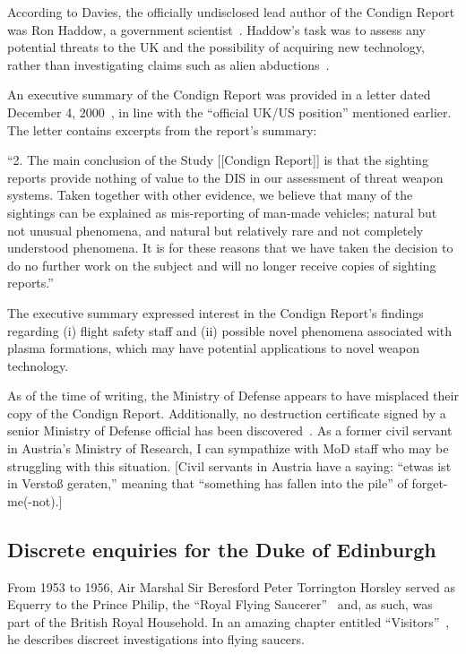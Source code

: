 According to Davies, the officially undisclosed lead author of the Condign Report was Ron Haddow, a government scientist~\cite{Clarke2022Nov}. Haddow's task was to assess any potential threats to the UK and the possibility of acquiring new technology, rather than investigating claims such as alien abductions~\cite{BibEntry2018May}.

An executive summary of the Condign Report was provided in a letter dated December 4, 2000~\cite{Clarke2022Oct}, in line with the ``official UK/US position'' mentioned earlier. The letter contains excerpts from the report's summary:
\begin{svgraybox}
``2. The main conclusion of the Study [[Condign Report]] is that the sighting reports provide nothing of value to the
DIS in our assessment of threat weapon systems. Taken together with other evidence, we believe that
many of the sightings can be explained as mis-reporting of man-made vehicles; natural but not
unusual phenomena, and natural but relatively rare and not completely understood phenomena. It is
for these reasons that we have taken the decision to do no further work on the subject and will no
longer receive copies of sighting reports.''
\end{svgraybox}
The executive summary expressed interest in the Condign Report's findings regarding (i) flight safety staff and (ii) possible novel phenomena associated with plasma formations, which may have potential applications to novel weapon technology.

As of the time of writing, the Ministry of Defense appears to have misplaced their copy of the Condign Report. Additionally, no destruction certificate signed by a senior Ministry of Defense official has been discovered~\cite{Clarke2022Nov}. As a former civil servant in Austria's Ministry of Research, I can sympathize with MoD staff who may be struggling with this situation.
[Civil servants in Austria have a saying: ``etwas ist in Versto{\ss} geraten,'' meaning that
``something has fallen into the pile'' of forget-me(-not).]

\subsection{Discrete enquiries for the Duke of Edinburgh}
\label{2023-UFO-part-Perception-types-UK-dede}

From 1953 to 1956, Air Marshal Sir Beresford Peter Torrington Horsley served as Equerry to the Prince Philip, the ``Royal Flying Saucerer''~\cite{Clarke-Philip-TRFS} and, as such, was part of the British Royal Household.
In an amazing chapter entitled ``Visitors''~\cite[Chapter~10]{Horsley1998Jan}, he describes discreet investigations into flying saucers.

